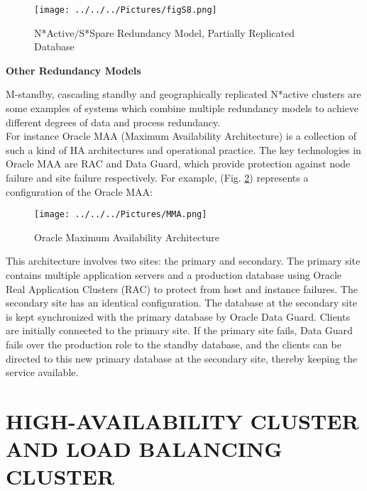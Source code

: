 \documentclass[english]{tktltiki2}
\theoremstyle{definition}
\theoremstyle{remark}
\begin{document}
\begin{figure}[h!]
\texttt{[image: ../../../Pictures/figS8.png]} 
\caption{N*Active/S*Spare Redundancy Model, Partially Replicated Database \cite{inproceedings}}
\label{fig:N8}
\end{figure}

\pagebreak
\begin{flushleft}
\textbf{Other Redundancy Models}
\end{flushleft}
M-standby, cascading standby and geographically replicated N*active clusters  \cite{MAA} are some examples of systems which combine multiple redundancy models to achieve different degrees of  data and process redundancy.\\
For instance Oracle MAA (Maximum Availability Architecture) \cite{MAA} is a collection of such a kind of HA architectures and operational practice. The key technologies in Oracle MAA are RAC and Data Guard, which provide protection against node failure and site failure respectively. For example, (Fig. \ref{fig:N12}) represents a configuration of the Oracle MAA:

\begin{figure}[h!]
\texttt{[image: ../../../Pictures/MMA.png]} 
\caption{Oracle Maximum Availability Architecture \cite{MAA}}
\label{fig:N12}
\end{figure}


\pagebreak

This architecture involves two sites: the primary and secondary. The primary site
contains multiple application servers and a production database using Oracle Real Application Clusters (RAC) to protect from host and instance failures. The secondary site has an identical configuration. The database at the secondary site is kept synchronized with the primary database by Oracle Data Guard. Clients are initially connected to the primary site. If the primary site fails, Data Guard fails over the production role to the standby database, and the clients can be directed to this new primary database at the secondary site, thereby keeping the service available.


\pagebreak

\section{HIGH-AVAILABILITY CLUSTER AND LOAD BALANCING CLUSTER}
\end{document}
